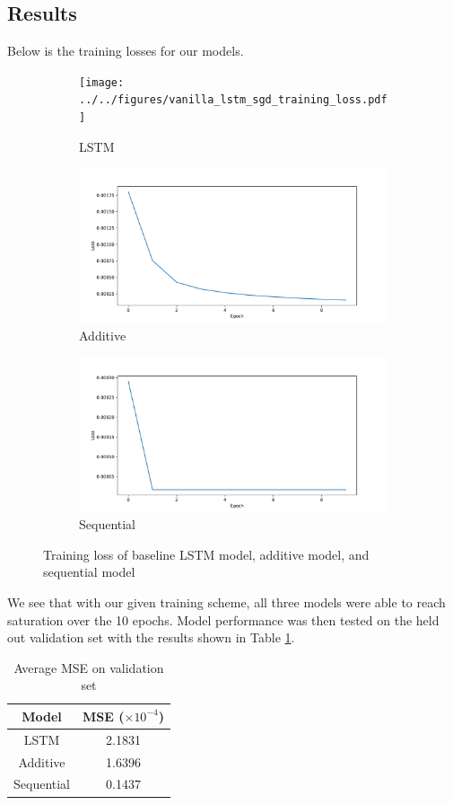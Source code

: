 \subsection{Results}

Below is the training losses for our models.

\begin{figure}[H]
	\centering
	\begin{subfigure}{0.32\linewidth}
		\texttt{[image: ../../figures/vanilla\_lstm\_sgd\_training\_loss.pdf]}
		\caption{LSTM}
	\end{subfigure}
	\begin{subfigure}{0.32\linewidth}
		\includegraphics[width=\linewidth]{../../figures/additive_model_training_loss.pdf}
		\caption{Additive}
	\end{subfigure}
	\begin{subfigure}{0.32\linewidth}
		\includegraphics[width=\linewidth]{../../figures/sequential_model_training_loss.pdf}
		\caption{Sequential}
	\end{subfigure}
	\caption{Training loss of baseline LSTM model, additive model, and sequential model}
	\label{fig:lstm_loss}
\end{figure}

We see that with our given training scheme, all three models were able to reach saturation over the 10 epochs. Model performance was then tested on the held out validation set with the results shown in Table \ref{tab:results_summary}.

\begin{table}[H]
	\centering
	\begin{tabular}{|c|c|}
	\hline
	Model & MSE ($\times 10^{-4}$) \\
	\hline
	LSTM & 2.1831 \\
	Additive & 1.6396 \\
	Sequential & 0.1437 \\
	\hline
	\end{tabular}
	\caption{Average MSE on validation set}
	\label{tab:results_summary}
\end{table}